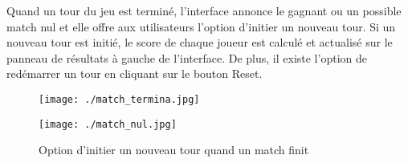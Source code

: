 Quand un tour du jeu est terminé, l’interface annonce le gagnant ou un possible match nul et elle offre aux utilisateurs l’option d’initier un nouveau tour. Si un nouveau tour est initié, le score de chaque joueur est calculé et actualisé sur le panneau de résultats à gauche de l’interface. De plus, il existe l’option de redémarrer un tour en cliquant sur le bouton Reset.



\begin{figure}[H]
	\centering
	
	\begin{minipage}[b]{0.45\textwidth}
		
		\texttt{[image: ./match\_termina.jpg]}
	\end{minipage}
	\hfill
	\begin{minipage}[b]{0.45\textwidth}
		
		\texttt{[image: ./match\_nul.jpg]}
	\end{minipage}
	\captionsetup{justification=centering,margin=1cm}
	\caption{Option d’initier un nouveau tour quand un match finit}
	\label{fig:match}
\end{figure}
\pagebreak



%
%		
%
